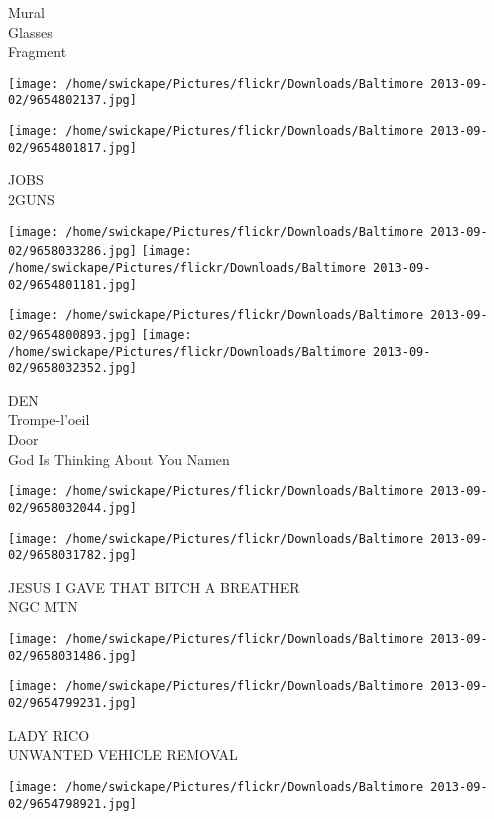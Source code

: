 \documentclass[10pt,letterpaper]{article}
\begin{document}
Mural\\
Glasses\\
Fragment\\
\pagebreak

\texttt{[image: /home/swickape/Pictures/flickr/Downloads/Baltimore 2013-09-02/9654802137.jpg]}

\vspace{0.25in}
\texttt{[image: /home/swickape/Pictures/flickr/Downloads/Baltimore 2013-09-02/9654801817.jpg]}

JOBS\\
2GUNS\\
\pagebreak

\texttt{[image: /home/swickape/Pictures/flickr/Downloads/Baltimore 2013-09-02/9658033286.jpg]}
\texttt{[image: /home/swickape/Pictures/flickr/Downloads/Baltimore 2013-09-02/9654801181.jpg]}

\texttt{[image: /home/swickape/Pictures/flickr/Downloads/Baltimore 2013-09-02/9654800893.jpg]}
\texttt{[image: /home/swickape/Pictures/flickr/Downloads/Baltimore 2013-09-02/9658032352.jpg]}

DEN\\
Trompe{-}l'oeil\\
Door\\
God Is Thinking About You Namen\\
\pagebreak

\texttt{[image: /home/swickape/Pictures/flickr/Downloads/Baltimore 2013-09-02/9658032044.jpg]}

\vspace{0.25in}
\texttt{[image: /home/swickape/Pictures/flickr/Downloads/Baltimore 2013-09-02/9658031782.jpg]}

JESUS I GAVE THAT BITCH A BREATHER\\
NGC MTN\\
\pagebreak

\texttt{[image: /home/swickape/Pictures/flickr/Downloads/Baltimore 2013-09-02/9658031486.jpg]}

\vspace{0.25in}
\texttt{[image: /home/swickape/Pictures/flickr/Downloads/Baltimore 2013-09-02/9654799231.jpg]}

LADY RICO\\
UNWANTED VEHICLE REMOVAL\\
\pagebreak

\texttt{[image: /home/swickape/Pictures/flickr/Downloads/Baltimore 2013-09-02/9654798921.jpg]}
\end{document}

